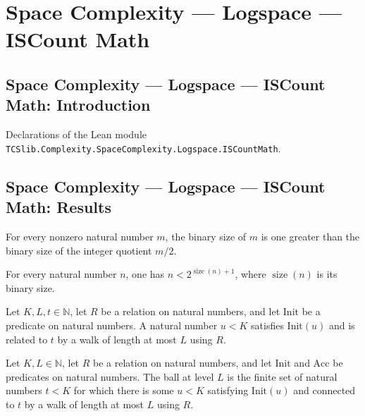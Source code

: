 \section{Space Complexity --- Logspace --- ISCount Math}
\subsection*{Space Complexity --- Logspace --- ISCount Math: Introduction}

Declarations of the Lean module \texttt{TCSlib.Complexity.SpaceComplexity.Logspace.ISCountMath}.

\subsection*{Space Complexity --- Logspace --- ISCount Math: Results}

\begin{lemma}
\label{Complexity.LogProg.ISCount.size_half}
\leanok
{}
For every nonzero natural number $m$, the binary size of $m$ is one greater than the
binary size of the integer quotient $m/2$.
\end{lemma}

\begin{lemma}
\label{Complexity.LogProg.ISCount.lt_two_pow_size_succ}
\leanok
{}
For every natural number $n$, one has $n<2^{\operatorname{size}(n)+1}$, where
$\operatorname{size}(n)$ is its binary size.
\end{lemma}

\begin{definition}
\label{Complexity.LogProg.ISCount.Mem}
\leanok
{}
Let $K,L,t\in\mathbb{N}$, let $R$ be a relation on natural numbers, and let
$\mathrm{Init}$ be a predicate on natural numbers. A natural number $u<K$ satisfies
$\mathrm{Init}(u)$ and is related to $t$ by a walk of length at most $L$ using $R$.
\end{definition}

\begin{definition}
\label{Complexity.LogProg.ISCount.ball}
\leanok
{}
Let $K,L\in\mathbb{N}$, let $R$ be a relation on natural numbers, and let
$\mathrm{Init}$ and $\mathrm{Acc}$ be predicates on natural numbers. The ball at level
$L$ is the finite set of natural numbers $t<K$ for which there is some $u<K$ satisfying
$\mathrm{Init}(u)$ and connected to $t$ by a walk of length at most $L$ using $R$.
\end{definition}

